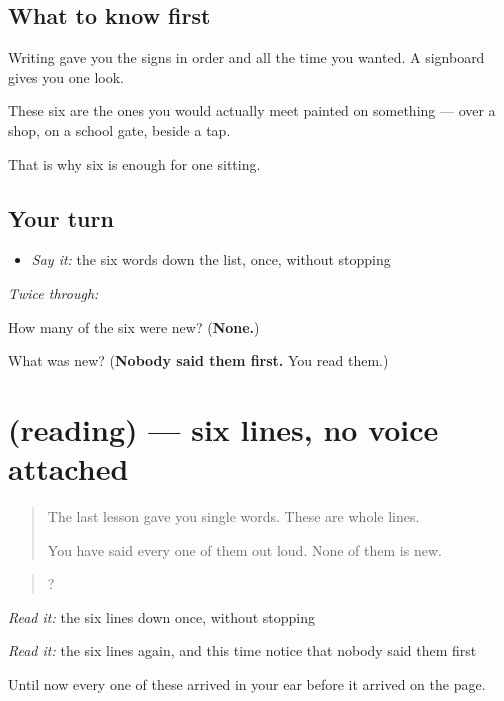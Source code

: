\subsection*{What to know first}
Writing gave you the signs in order and all the time you wanted. A signboard gives you one look.

These six are the ones you would actually meet painted on something — over a shop, on a school gate, beside a tap.

That is why six is enough for one sitting.

\subsection*{Your turn}
\begin{itemize}
\raggedright
  \item \emph{Say it:} the six words down the list, once, without stopping
\end{itemize}

\emph{Twice through:}

\begin{tcolorbox}[breakable,colback=teal!4,colframe=teal!35!black,title={Before you move on}]
How many of the six were new? (\textbf{None.})

What was new? (\textbf{Nobody said them first.} You read them.)
\end{tcolorbox}
\section[(reading)]{(reading) — six lines, no voice attached}

\label{lesson:GU-C44-lines}



\begin{quote}
The last lesson gave you single words. These are whole lines.

You have said every one of them out loud. None of them is new.
\end{quote}

\begin{tcolorbox}[breakable,skin=enhanced,colback=orange!6,colframe=orange!45!black,boxrule=0.5pt,arc=1mm,left=6pt,right=6pt,top=4pt,bottom=4pt,fonttitle=\bfseries,title={Read this}]
\begin{quote}
      ?         
\end{quote}

\emph{Read it:} the six lines down once, without stopping

\emph{Read it:} the six lines again, and this time notice that nobody said them first

Until now every one of these arrived in your ear before it arrived on the page.
\end{tcolorbox}

